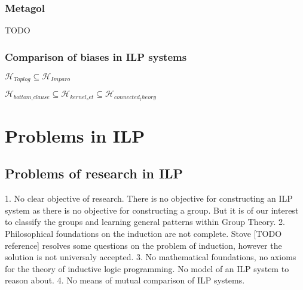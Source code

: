 \subsection{Metagol}
TODO


\subsection{Comparison of biases in ILP systems}
$\mathcal{H}_{Toplog} \subseteq \mathcal{H}_{Imparo}$

$\mathcal{H}_{bottom\_clause} \subseteq \mathcal{H}_{kernel_set} \subseteq \mathcal{H}_{connected_theory}$

\chapter{Problems in ILP}

\iffalse
\chapter{Learning the reality}
It is important to understand how powerful our ILP systems are - what models they are capable of learning and what models they are never going to learn from the given data.
\section{Philosophical discussion}
In order to learn the reality, do we want to induce questions or theories of the models of the observations and the background knowledge? We could use all the observations to reason about the world, but the observations may be too numerous, hence a more compact theory axiomatization would be useful.
Why do we ask a question $Q$? That is so that we would find out what observation we should make. It is in the case that an environment oracle is available.
\fi
\section{Problems of research in ILP}
1. No clear objective of research. There is no objective for constructing an ILP system as there is no objective for constructing a group. But it is of our interest to classify the groups and learning general patterns within Group Theory.
2. Philosophical foundations on the induction are not complete. Stove [TODO reference] resolves some questions on the problem of induction, however the solution is not universaly accepted.
3. No mathematical foundations, no axioms for the theory of inductive logic programming. No model of an ILP system to reason about.
4. No means of mutual comparison of ILP systems.
\iffalse
